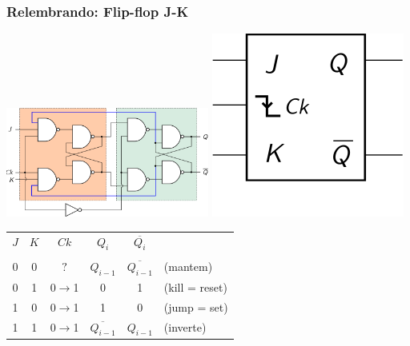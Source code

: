 \documentclass{beamer}
\newcommand{\Not}[1]{\overline{#1}}
\begin{document}
\begin{frame}
\frametitle{Relembrando: Flip-flop J-K}

\begin{center}
\includegraphics[width=0.5\textwidth]{images/flipflopJK2}%
\hspace{3ex}%
\raisebox{40pt}{\Huge$=$}%
\hspace{3ex}%
\includegraphics{images/flipflopJK_blackbox}

\vspace{12pt}


\begin{tabular}{ccc||ccl}
$J$ & $K$ &        $Ck$       & $Q_i$           & $\Not{Q_i}$ \\[4pt]
\cline{1-5}
    &     &                   &                 &    \\[-8pt]
 0  &  0  &        $?$        & $Q_{i-1}$       & $\Not{Q_{i-1}}$ & (mantem) \\
 0  &  1  &  0$\rightarrow$1  &     0           &       1         & (kill = reset) \\
 1  &  0  &  0$\rightarrow$1  &     1           &       0         & (jump = set) \\ 
 1  &  1  &  0$\rightarrow$1  & $\Not{Q_{i-1}}$ & $Q_{i-1}$       & (inverte) \\
\end{tabular}

\end{center}

\end{frame}
\end{document}
